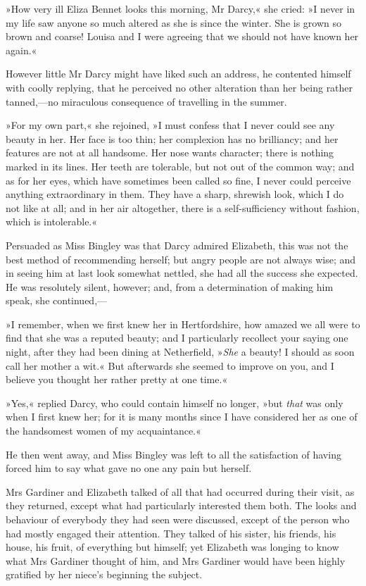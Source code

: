 »How very ill Eliza Bennet looks this morning, Mr Darcy,« she cried: »I never in my life saw anyone so much altered as she is since the winter. She is grown so brown and coarse! Louisa and I were agreeing that we should not have known her again.«

However little Mr Darcy might have liked such an address, he contented himself with coolly replying, that he perceived no other alteration than her being rather tanned,—no miraculous consequence of travelling in the summer.

»For my own part,« she rejoined, »I must confess that I never could see any beauty in her. Her face is too thin; her complexion has no brilliancy; and her features are not at all handsome. Her nose wants character; there is nothing marked in its lines. Her teeth are tolerable, but not out of the common way; and as for her eyes, which have sometimes been called so fine, I never could perceive anything extraordinary in them. They have a sharp, shrewish look, which I do not like at all; and in her air altogether, there is a self-sufficiency without fashion, which is intolerable.«

Persuaded as Miss Bingley was that Darcy admired Elizabeth, this was not the best method of recommending herself; but angry people are not always wise; and in seeing him at last look somewhat nettled, she had all the success she expected. He was resolutely silent, however; and, from a determination of making him speak, she continued,—

»I remember, when we first knew her in Hertfordshire, how amazed we all were to find that she was a reputed beauty; and I particularly recollect your saying one night, after they had been dining at Netherfield, »\textit{She} a beauty! I should as soon call her mother a wit.« But afterwards she seemed to improve on you, and I believe you thought her rather pretty at one time.«

»Yes,« replied Darcy, who could contain himself no longer, »but \textit{that} was only when I first knew her; for it is many months since I have considered her as one of the handsomest women of my acquaintance.«

He then went away, and Miss Bingley was left to all the satisfaction of having forced him to say what gave no one any pain but herself.

Mrs Gardiner and Elizabeth talked of all that had occurred during their visit, as they returned, except what had particularly interested them both. The looks and behaviour of everybody they had seen were discussed, except of the person who had mostly engaged their attention. They talked of his sister, his friends, his house, his fruit, of everything but himself; yet Elizabeth was longing to know what Mrs Gardiner thought of him, and Mrs Gardiner would have been highly gratified by her niece's beginning the subject.
